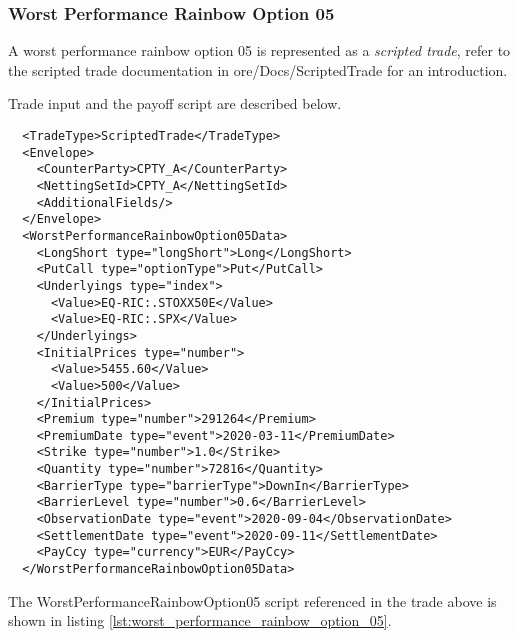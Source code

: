 \subsubsection*{Worst Performance Rainbow Option 05}

A worst performance rainbow option 05 is represented as a {\em scripted trade},
refer to the scripted trade documentation in ore/Docs/ScriptedTrade
for an introduction.

Trade input and the payoff script are described below.

\begin{verbatim}
  <TradeType>ScriptedTrade</TradeType>
  <Envelope>
    <CounterParty>CPTY_A</CounterParty>
    <NettingSetId>CPTY_A</NettingSetId>
    <AdditionalFields/>
  </Envelope>
  <WorstPerformanceRainbowOption05Data>
    <LongShort type="longShort">Long</LongShort>
    <PutCall type="optionType">Put</PutCall>
    <Underlyings type="index">
      <Value>EQ-RIC:.STOXX50E</Value>
      <Value>EQ-RIC:.SPX</Value>
    </Underlyings>
    <InitialPrices type="number">
      <Value>5455.60</Value>
      <Value>500</Value>
    </InitialPrices>
    <Premium type="number">291264</Premium>
    <PremiumDate type="event">2020-03-11</PremiumDate>
    <Strike type="number">1.0</Strike>
    <Quantity type="number">72816</Quantity>
    <BarrierType type="barrierType">DownIn</BarrierType>
    <BarrierLevel type="number">0.6</BarrierLevel>
    <ObservationDate type="event">2020-09-04</ObservationDate>
    <SettlementDate type="event">2020-09-11</SettlementDate>
    <PayCcy type="currency">EUR</PayCcy>
  </WorstPerformanceRainbowOption05Data>
\end{verbatim}

The WorstPerformanceRainbowOption05 script referenced in the trade above is shown in listing
\ref{lst:worst_performance_rainbow_option_05}.

